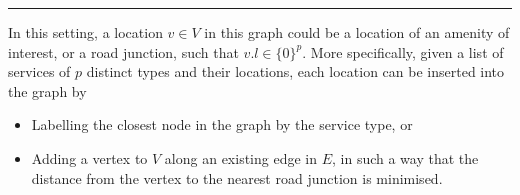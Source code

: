 \rule{\textwidth}{0.4pt}

In this setting, a location $v\in V$ in this graph could be a location of an amenity of interest, or a road junction, such that $v.l\in\{0\}^p$. More specifically, given a list of services of $p$ distinct types and their locations, each location can be inserted into the graph by

\begin{itemize}
    \item Labelling the closest node in the graph by the service type, or
    \item Adding a vertex to $V$ along an existing edge in $E$, in such a way that the distance from the vertex to the nearest road junction is minimised.
\end{itemize}